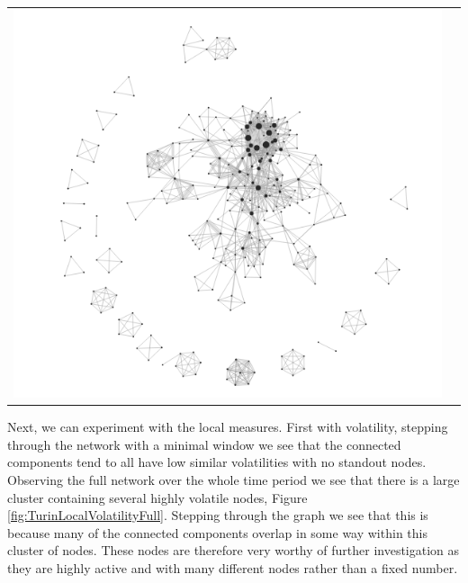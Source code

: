 \begin{center}
\begin{tabular}{cc}
\includegraphics[trim={0 0 0 0}, width=140mm]{./Figures/TurinLocalVolatilityFull.png}
\end{tabular}
\label{fig:TurinLocalVolatilityFull}
\end{center}
Next, we can experiment with the local measures. First with volatility, stepping through the network with a minimal window we see that the connected components tend to all have low similar volatilities with no standout nodes. Observing the full network over the whole time period we see that there is a large cluster containing several highly volatile nodes, Figure \ref{fig:TurinLocalVolatilityFull}. Stepping through the graph we see that this is because many of the connected components overlap in some way within this cluster of nodes. These nodes are therefore very worthy of further investigation as they are highly active and with many different nodes rather than a fixed number.


